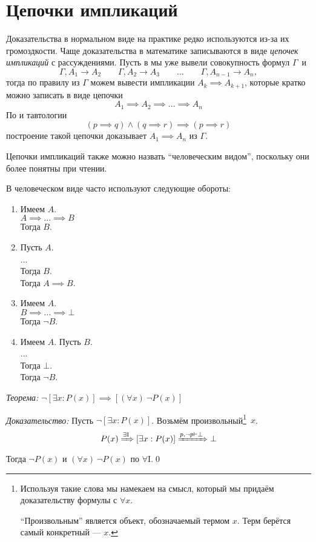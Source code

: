 \section{Цепочки импликаций}

Доказательства в нормальном виде на практике редко используются из-за их
громоздкости.
Чаще доказательства в математике записываются в виде {\it цепочек импликаций}
 с рассуждениями.
Пусть в мы уже вывели совокупность формул $\Gamma$~и
\[
  \Gamma,A_1\to A_2\qquad \Gamma,A_2\to A_3
  \qquad  ... \qquad \Gamma,A_{n-1}\to A_{n},
\]
тогда по правилу \implic{} из $\Gamma$ можем вывести импликации
${A_{k}\implies A_{k+1}}$, которые кратко можно записать в виде цепочки
\[
  A_1\implies A_2\implies ...\implies A_{n}
\]
По \taut{} и тавтологии
\[
  (p\implies q)\land (q\implies r)\implies (p\implies r)
\]
построение такой цепочки доказывает $A_1\implies A_{n}$ из $\Gamma$.

Цепочки импликаций также можно назвать ``человеческим видом'',
поскольку они более понятны при чтении.

В человеческом виде часто используют следующие обороты:
\begin{multicols}{2}
  \begin{enumerate}[label=(\roman*)]
    \item{}
    Имеем $A$.\\
    $A\implies...\implies B$\\
    Тогда $B$.
    \item{}
    Пусть $A$.\\
    ...\\
    Тогда $B$.\\
    Тогда $A\implies B$.
    \item{}
    Имеем $A$.\\
    $B\implies ...\implies \bot$\\
    Тогда $\lnot B$.
    \item{}
    Имеем $A$. Пусть $B$.\\
    ...\\
    Тогда $\bot$.\\
    Тогда $\lnot B$.
  \end{enumerate}
\end{multicols}

\vspace{1em}
{\it Теорема:} $\lnot[\exists x:P(x)]\implies [(\forall x)~\lnot P(x)]$

{\it Доказательство:}
Пусть ${\lnot[\exists x:P(x)]}$.
Возьмём произвольный\footnote{
  Используя такие слова мы намекаем на смысл, который мы придаём доказательству
  формулы с $\forall x$.

  ``Произвольным'' является объект, обозначаемый термом $x$.
  Терм берётся самый конкретный --- $x$.}~$x$.
\[
  P(x)\xRightarrow{\text{$\exists$I}} [\exists x:P(x)]
  \xRightarrow{p,\lnot p\vdash\bot} \bot
\]
Тогда $\lnot P(x)$ и $(\forall x)~\lnot P(x)$
по $\forall$I.\qed

